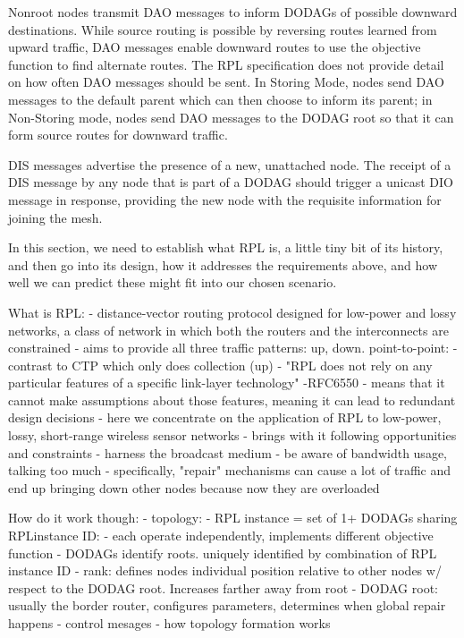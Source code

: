 Nonroot nodes transmit DAO messages to inform DODAGs of possible downward destinations.
While source routing is possible by reversing routes learned from upward traffic, DAO messages enable downward routes to use the objective function to find alternate routes.
The RPL specification does not provide detail on how often DAO messages should be sent.
In Storing Mode, nodes send DAO messages to the default parent which can then choose to inform its parent; in Non-Storing mode, nodes send DAO messages to the DODAG root so that it can form source routes for downward traffic.

DIS messages advertise the presence of a new, unattached node.
The receipt of a DIS message by any node that is part of a DODAG should trigger a unicast DIO message in response, providing the new node with the requisite information for joining the mesh.

In this section, we need to establish what RPL is, a little tiny bit of its history, and then
go into its design, how it addresses the requirements above, and how well we can predict
these might fit into our chosen scenario.

What is RPL:
  - distance-vector routing protocol designed for low-power and lossy networks, a class of
    network in which both the routers and the interconnects are constrained
  - aims to provide all three traffic patterns: up, down. point-to-point:
    - contrast to CTP which only does collection (up)
  - "RPL does not rely on any particular features of a specific link-layer technology" -RFC6550
  - means that it cannot make assumptions about those features, meaning it can lead to
    redundant design decisions
  - here we concentrate on the application of RPL to low-power, lossy, short-range wireless
    sensor networks
  - brings with it following opportunities and constraints
    - harness the broadcast medium
    - be aware of bandwidth usage, talking too much
    - specifically, "repair" mechanisms can cause a lot of traffic and end up bringing down
      other nodes because now they are overloaded

How do it work though:
- topology:
  - RPL instance = set of 1+ DODAGs sharing RPLinstance ID:
    - each operate independently, implements different objective function
  - DODAGs identify roots. uniquely identified by combination of RPL instance ID
  - rank: defines nodes individual position relative to other nodes w/ respect to the
    DODAG root. Increases farther away from root
  - DODAG root: usually the border router, configures parameters, determines when global
    repair happens
- control mesages
- how topology formation works

